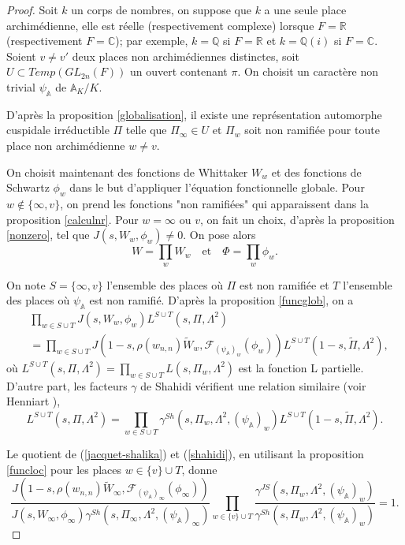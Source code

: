 \documentclass{amsart}
\begin{document}
 \begin{proof}
 Soit $k$ un corps de nombres, on suppose que $k$ a une seule place archimédienne, elle est réelle (respectivement complexe) lorsque $F=\mathbb{R}$ (respectivement $F=\mathbb{C}$); par exemple, $k=\mathbb{Q}$ si $F=\mathbb{R}$ et $k=\mathbb{Q}(i)$ si $F=\mathbb{C}$. Soient $v \neq v'$ deux places non archimédiennes distinctes, soit $U \subset Temp(GL_{2n}(F))$ un ouvert contenant $\pi$. On choisit un caractère non trivial $\psi_\mathbb{A}$ de $\mathbb{A}_K/K$.
 
 D'après la proposition \ref{globalisation}, il existe une représentation automorphe cuspidale irréductible $\Pi$ telle que $\Pi_{\infty} \in U$ et $\Pi_w$ soit non ramifiée pour toute place non archimédienne $w \neq v$.
 
 On choisit maintenant des fonctions de Whittaker $W_w$ et des fonctions de Schwartz $\phi_w$ dans le but d'appliquer l'équation fonctionnelle globale. Pour $w \not\in \{\infty, v\}$, on prend les fonctions "non ramifiées" qui apparaissent dans la proposition \ref{calculnr}. Pour $w = \infty$ ou $v$, on fait un choix, d'après la proposition \ref{nonzero}, tel que $J(s, W_w, \phi_w) \neq 0$. On pose alors
 $$W = \prod_w W_w \quad \text{et} \quad \Phi  = \prod_w \phi_w.$$
 
 On note $S = \{\infty, v\}$ l'ensemble des places où $\Pi$ est non ramifiée et $T$ l'ensemble des places où $\psi_\mathbb{A}$ est non ramifié. D'après la proposition \ref{funcglob}, on a
 \begin{equation}
 \label{jacquet-shalika}
 \begin{split}
 & \prod_{w \in S \cup T} J(s, W_w, \phi_w) L^{S \cup T}(s, \Pi, \Lambda^2) \\
 &= \prod_{w \in S \cup T} J(1-s, \rho(w_{n,n})\tilde{W}_w, \mathcal{F}_{(\psi_\mathbb{A})_w}(\phi_w)) L^{S \cup T}(1-s, \tilde{\Pi}, \Lambda^2),
 \end{split}
 \end{equation}
 où  $L^{S \cup T}(s, \Pi, \Lambda^2) = \prod_{w \in S \cup T} L(s, \Pi_w, \Lambda^2)$ est la fonction L partielle. D'autre part, les facteurs $\gamma$ de Shahidi vérifient une relation similaire (voir Henniart \cite{henniart}),
 \begin{equation}
 \label{shahidi}
 L^{S \cup T}(s, \Pi, \Lambda^2) = \prod_{w \in S \cup T} \gamma^{Sh}(s, \Pi_w, \Lambda^2, (\psi_\mathbb{A})_w) L^{S \cup T}(1-s, \tilde{\Pi}, \Lambda^2).
 \end{equation}
 
 Le quotient de (\ref{jacquet-shalika}) et (\ref{shahidi}), en utilisant la proposition \ref{funcloc} pour les places $w \in \{v\} \cup T$, donne
 \begin{equation}
 \frac{J(1-s, \rho(w_{n,n})\tilde{W}_\infty, \mathcal{F}_{(\psi_\mathbb{A})_\infty}(\phi_\infty))}{J(s, W_\infty, \phi_\infty)\gamma^{Sh}(s, \Pi_\infty, \Lambda^2, (\psi_\mathbb{A})_\infty)} \prod_{w \in \{v\} \cup T} \frac{\gamma^{JS}(s, \Pi_w, \Lambda^2, (\psi_\mathbb{A})_w)}{\gamma^{Sh}(s, \Pi_w, \Lambda^2, (\psi_\mathbb{A})_w)} = 1.
 \end{equation}
 

\end{proof}
\end{document}
